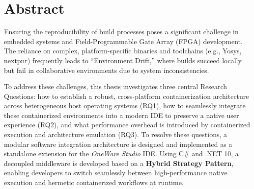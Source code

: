 % 
% 
% 

\chapter*{Abstract}

Ensuring the reproducibility of build processes poses a significant challenge in embedded systems and Field-Programmable Gate Array (FPGA) development. The reliance on complex, platform-specific binaries and toolchains (e.g., Yosys, nextpnr) frequently leads to ``Environment Drift,'' where builds succeed locally but fail in collaborative environments due to system inconsistencies.

To address these challenges, this thesis investigates three central Research Questions: how to establish a robust, cross-platform containerization architecture across heterogeneous host operating systems (RQ1), how to seamlessly integrate these containerized environments into a modern IDE to preserve a native user experience (RQ2), and what performance overhead is introduced by containerized execution and architecture emulation (RQ3). To resolve these questions, a modular software integration architecture is designed and implemented as a standalone extension for the \textit{OneWare Studio} IDE. Using C\# and .NET 10, a decoupled middleware is developed based on a \textbf{Hybrid Strategy Pattern}, enabling developers to switch seamlessly between high-performance native execution and hermetic containerized workflows at runtime.

